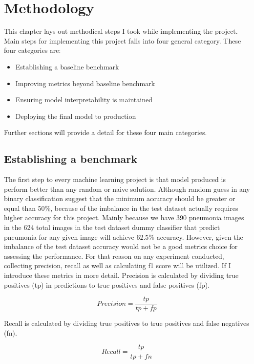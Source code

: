 \chapter{Methodology} \label{chap:methodology}
This chapter lays out methodical steps I took while implementing the project.
Main steps for implementing this project falls into four general category.
These four categories are:
\begin{itemize}
    \item Establishing a baseline benchmark
    \item Improving metrics beyond baseline benchmark
    \item Ensuring model interpretability is maintained
    \item Deploying the final model to production
\end{itemize}

Further sections will provide a detail for these four main categories.

\section{Establishing a benchmark}
The first step to every machine learning project is that model produced is perform better than any random or naive solution.
Although random guess in any binary classification suggest that the minimum accuracy should be greater or equal than 50\%, because of the imbalance in the test dataset actually requires higher accuracy for this project.
Mainly because we have 390 pneumonia images in the 624 total images in the test dataset dummy classifier that predict pneumonia for any given image will achieve 62.5\% accuracy.
However, given the imbalance of the test dataset accuracy would not be a good metrics choice for assessing the performance.
For that reason on any experiment conducted, collecting precision, recall as well as calculating f1 score will be utilized.
If I introduce these metrics in more detail.
Precision is calculated by dividing true positives (tp) in predictions to true positives and false positives (fp).

\begin{equation}
    Precision = \frac{tp}{tp + fp}
\end{equation}

Recall is calculated by dividing true positives to true positives and false negatives (fn).

\begin{equation}
    Recall = \frac{tp}{tp + fn}
\end{equation}

